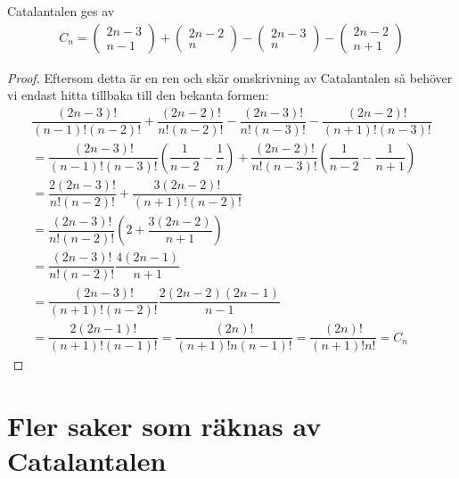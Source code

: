 \documentclass{tufte-handout}
\begin{document}
\par
\begin{cor}
  Catalantalen ges av 
  \begin{equation*}
    \begin{gathered}
      C_n = \begin{pmatrix}2n-3\\n-1\end{pmatrix}+\begin{pmatrix}2n-2\\n\end{pmatrix}-\begin{pmatrix}2n-3\\n\end{pmatrix}-\begin{pmatrix}2n-2\\n+1\end{pmatrix}
    \end{gathered}
  \end{equation*}
\end{cor}\par
\begin{proof}
  Eftersom detta är en ren och skär omskrivning av Catalantalen så behöver vi endast hitta tillbaka till den bekanta formen:
  \begin{equation*}
    \begin{gathered}
      \dfrac{(2n-3)!}{(n-1)!(n-2)!}+\dfrac{(2n-2)!}{n!(n-2)!}-\dfrac{(2n-3)!}{n!(n-3)!}-\dfrac{(2n-2)!}{(n+1)!(n-3)!}\\
      = \dfrac{(2n-3)!}{(n-1)!(n-3)!}\left(\dfrac{1}{n-2}-\dfrac{1}{n}\right)+\dfrac{(2n-2)!}{n!(n-3)!}\left(\dfrac{1}{n-2}-\dfrac{1}{n+1}\right)\\
      =\dfrac{2(2n-3)!}{n!(n-2)!}+\dfrac{3(2n-2)!}{(n+1)!(n-2)!}\\
      =\dfrac{(2n-3)!}{n!(n-2)!}\left(2+\dfrac{3(2n-2)}{n+1}\right)\\
      =\dfrac{(2n-3)!}{n!(n-2)!}\dfrac{4(2n-1)}{n+1}\\
      =\dfrac{(2n-3)!}{(n+1)!(n-2)!}\dfrac{2(2n-2)(2n-1)}{n-1}\\
      =\dfrac{2(2n-1)!}{(n+1)!(n-1)!}=\dfrac{(2n)!}{(n+1)!n(n-1)!} = \dfrac{(2n)!}{(n+1)!n!} = C_n
    \end{gathered}
  \end{equation*}
\end{proof}

\section{Fler saker som räknas av Catalantalen}
\end{document}
